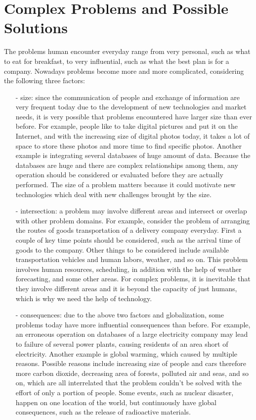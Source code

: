 \section{Complex Problems and Possible Solutions}
\label{ch0:problemsAndSol}

The problems human encounter everyday range from very personal, such as what to eat for breakfast, to very influential, such as what the best plan is for a company. Nowadays problems become more and more complicated, considering the following three factors:
\begin{itemize}
\item[-]size: since the communication of people and exchange of information are very frequent today due to the development of new technologies and market needs, it is very possible that problems encountered have larger size than ever before. For example, people like to take digital pictures and put it on the Internet, and with the increasing size of digital photos today, it takes a lot of space to store these photos and more time to find specific photos. Another example is integrating several databases of huge amount of data. Because the databases are huge and there are complex relationships among them, any operation should be considered or evaluated before they are actually performed. The size of a problem matters because it could motivate new technologies which deal with new challenges brought by the size.
\item[-]intersection: a problem may involve different areas and intersect or overlap with other problem domains. For example, consider the problem of arranging the routes of goods transportation of a delivery company everyday. First a couple of key time points should be considered, such as the arrival time of goods to the company. Other things to be considered include available transportation vehicles and human labors, weather, and so on. This problem involves human resources, scheduling, in addition with the help of weather forecasting, and some other areas. For complex problems, it is inevitable that they involve different areas and it is beyond the capacity of just humans, which is why we need the help of technology.     
\item[-]consequences: due to the above two factors and globalization, some problems today have more influential consequences than before. For example, an erroneous operation on databases of a large electricity company may lead to failure of several power plants, causing residents of an area short of electricity. Another example is global warming, which caused by multiple reasons. Possible reasons include increasing size of people and cars therefore more carbon dioxide, decreasing area of forests, polluted air and seas, and so on, which are all interrelated that the problem couldn't be solved with the effort of only a portion of people. Some events, such as nuclear disaster, happen on one location of the world, but continuously have global consequences, such as the release of radioactive materials.              
\end{itemize}

